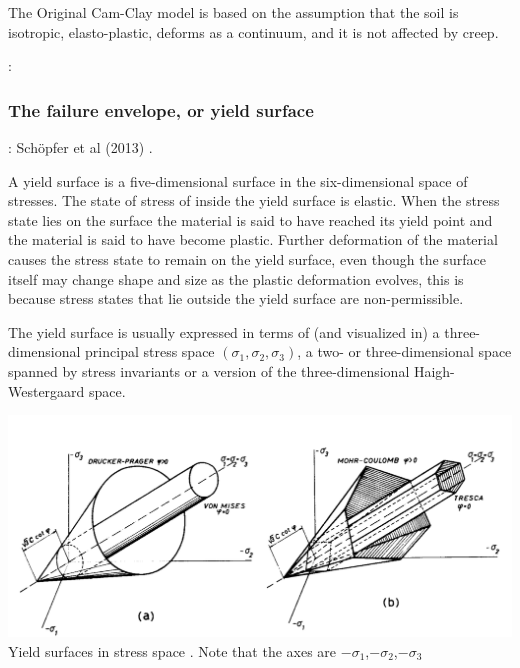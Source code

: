 The Original Cam-Clay model is based on the assumption that the soil is isotropic, elasto-plastic, deforms as a continuum, and it is not affected by creep.

\Literature: \cite{pehu03}

\subsubsection{The failure envelope, or yield surface}
\label{ss:envelope} 

\Literature: Sch{\"o}pfer et al (2013) \cite{sccm13}.

A yield surface is a five-dimensional surface in the six-dimensional space of stresses. 
The state of stress of inside the yield surface is elastic. 
When the stress state lies on the surface the material is said to have reached its yield point 
and the material is said to have become plastic. Further deformation of the material causes 
the stress state to remain on the yield surface, even though the surface itself may change shape and 
size as the plastic deformation evolves, this is because stress states that lie outside the yield surface are non-permissible.

The yield surface is usually expressed in terms of (and visualized in) a three-dimensional principal stress space $(\sigma_1,\sigma_2,\sigma_3)$, a two- or three-dimensional space spanned by stress invariants 
or a version of the three-dimensional Haigh-Westergaard space. 

\begin{center}
\includegraphics[width=14cm]{images/rheology/surfaces}\\
{\captionfont Yield surfaces in stress space \cite{zico74}. Note that 
the axes are $-\sigma_1$,$-\sigma_2$,$-\sigma_3$}
\end{center} 


